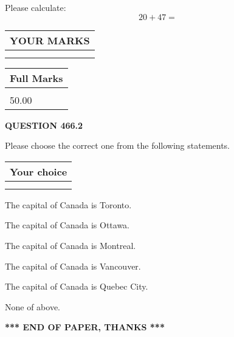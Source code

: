 \documentclass[12pt]{article}
\begin{document}
  
 
Please calculate:
\begin{equation}
20 +  %
47 = \nonumber
\end{equation}
 

 

 
  
\vspace{0.2in}
  
\noindent\begin{tabular}{|l|}
\hline
 YOUR MARKS  \\
\hline
 \\ 
 \\ 
\hline
\end{tabular}
\hspace{0.05in} \begin{tabular}{|l|}
\hline
 Full Marks  \\
\hline
 \\ 
50.00 \\
\hline
\end{tabular}
{\textbf{\Large{QUESTION
466.2 
}}}
  
  
Please choose the correct one from the following statements.
  
  
\noindent\hspace{3.0in} \begin{tabular}{|l|}
\hline
Your choice \\
\hline
 \\ 
 \\ 
\hline
\end{tabular}
  
  
 
 
The capital of Canada is Toronto.
 
 
The capital of Canada is Ottawa.
 
 
The capital of Canada is Montreal.
 
 
The capital of Canada is Vancouver.
 
 
The capital of Canada is Quebec City.
 
 
 None of above.
 
 
   
   
 \vspace{0.2in}
 
   
   
   
   
\vspace{1.0in} 
{\textbf{\large{ *** END OF PAPER, THANKS *** }}} 
   
\end{document}
